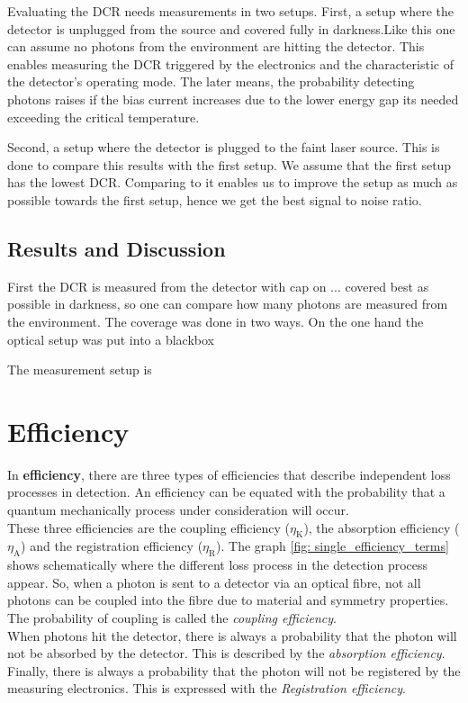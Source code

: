 Evaluating the DCR needs measurements in two setups.
First, a setup where the detector is unplugged from the source and covered fully in darkness.Like this one can assume no
photons from the environment are hitting the detector.
This enables measuring the DCR triggered by the electronics and the characteristic of the detector's operating mode.
The later means, the probability detecting photons raises if the bias current increases due to the lower energy gap
its needed exceeding the critical temperature.

Second, a setup where the detector is plugged to the faint laser source.
This is done to compare this results with the first setup.
We assume that the first setup has the lowest DCR.
Comparing to it enables us to improve the setup as much as possible towards the first setup,
hence we get the best signal to noise ratio.

\subsection*{Results and Discussion}

First the DCR is measured from the detector with cap on ...
covered best as possible in darkness, so one can compare how many photons are measured from the environment. The
coverage was done in two ways. On the one hand the optical setup was put into a blackbox

The measurement setup is

\section{Efficiency}
In \textbf{efficiency}, there are three types of efficiencies that describe independent loss processes in detection.
An efficiency can be equated with the probability that a quantum mechanically process under consideration will occur.\\
These three efficiencies are the coupling efficiency ($\eta_{\text{K}}$),
the absorption efficiency ($\eta_{\text{A}}$) and the registration efficiency ($\eta_{\text{R}}$).
The graph \ref{fig: single_efficiency_terms} shows schematically where the different loss process in the detection
process appear. So, when a photon is sent to a detector via an optical fibre, not all photons can be coupled into the
fibre due to material and symmetry properties.
The probability of coupling is called the \textit{coupling efficiency}. \\
When photons hit the detector, there is always a probability that the photon will not be absorbed by the detector.
This is described by the \textit{absorption efficiency}. \\
Finally, there is always a probability that the photon will not be registered by the measuring electronics.
This is expressed with the \textit{Registration efficiency}. \\


